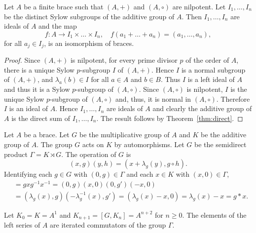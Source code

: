 \begin{corollary}
    \label{cor:product}
    Let $A$ be a finite brace such that $(A,+)$ and $(A,\circ)$ are nilpotent.
Let $I_1,\dots ,I_n$ be the distinct Sylow subgroups of the additive
group of $A$. Then $I_1,\dots ,I_n$ are ideals of $A$ and the map
\[
f:A\rightarrow I_1\times\dots\times I_n,
\quad
f(a_1+\dots+a_n)=(a_1,\dots ,a_n),
\]
for all $a_j\in I_j$, is an isomorphism of
braces.
\end{corollary}

\begin{proof}
Since $(A,+)$ is nilpotent, for every prime divisor $p$ of the order
of $A$, there is a unique Sylow $p$-subgroup $I$ of $(A,+)$. Hence $I$
is a normal subgroup of $(A,+)$, and $\lambda_a(b)\in I$ for all
$a\in A$ and $b\in B$. Thus $I$ is a left ideal of $A$ and thus it
is a Sylow $p$-subgroup of $(A,\circ)$. Since $(A,\circ)$ is
nilpotent, $I$ is the unique Sylow $p$-subgroup of $(A,\circ)$ and,
thus, it is normal in $(A,\circ)$. Therefore $I$ is an ideal of $A$.
Hence $I_1,\dots ,I_n$ are ideals of $A$ and clearly the additive
group of $A$ is the direct sum of $I_1,\dots ,I_n$. The result
follows by Theorem~\ref{thm:direct}.
\end{proof}


Let $A$ be a brace.  Let $G$ be the multiplicative group
of $A$ and $K$ be the additive group of $A$. The group $G$ acts on
$K$ by automorphisms. Let $G$ be the semidirect product
$\Gamma=K\rtimes G$. The operation of $G$ is 
\[
    (x,g)(y,h)=(x+\lambda_g(y),g\circ h).
\]
Identifying each $g\in G$ with $(0,g)\in\Gamma$ and each $x\in K$
with $(x,0)\in\Gamma$, 
\begin{align*}
[g,x]&= gxg^{-1}x^{-1}=(0,g)(x,0)(0,g')(-x,0)\\
&=(\lambda_g(x),g)(-\lambda^{-1}_g(x),g')
=(\lambda_g(x)-x,0)=\lambda_g(x)-x=g*x.
\end{align*}

Let $K_0=K=A^1$ and $K_{n+1}=[G,K_n]=A^{n+2}$ for $n\geq0$. 
The elements of the left series of $A$ are iterated commutators of
the group $\Gamma$.  

